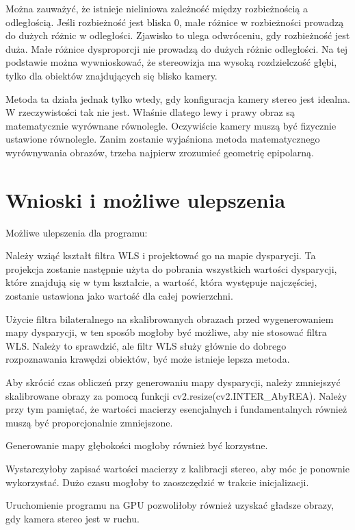 \documentclass[magisterska]{pracadypl}
\begin{document}
Można zauważyć, że istnieje nieliniowa zależność między rozbieżnością a odległością.
Jeśli rozbieżność jest bliska 0, małe różnice w rozbieżności prowadzą do dużych różnic w odległości.
Zjawisko to ulega odwróceniu, gdy rozbieżność jest duża. Małe różnice dysproporcji nie prowadzą do dużych różnic odległości. Na tej podstawie można wywnioskować, że stereowizja ma wysoką rozdzielczość głębi, tylko dla obiektów znajdujących się blisko kamery.

Metoda ta działa jednak tylko wtedy, gdy konfiguracja kamery stereo jest idealna. W
rzeczywistości tak nie jest. Właśnie dlatego lewy i prawy obraz są
matematycznie wyrównane równolegle. Oczywiście kamery muszą być fizycznie ustawione równolegle.
Zanim zostanie wyjaśniona metoda matematycznego wyrównywania obrazów, trzeba najpierw zrozumieć geometrię epipolarną.

\section{Wnioski i możliwe ulepszenia}

Możliwe ulepszenia dla programu:

Należy wziąć kształt filtra WLS i projektować go na mapie dysparycji. Ta projekcja zostanie następnie użyta do pobrania wszystkich wartości dysparycji, które znajdują się w tym kształcie, a wartość, która występuje najczęściej, zostanie ustawiona jako wartość dla całej powierzchni.

Użycie filtra bilateralnego na skalibrowanych obrazach przed wygenerowaniem mapy dysparycji, w ten sposób mogłoby być możliwe, aby nie stosować filtra WLS. Należy to sprawdzić, ale filtr WLS służy głównie do dobrego rozpoznawania krawędzi obiektów, być może istnieje lepsza metoda.

Aby skrócić czas obliczeń przy generowaniu mapy dysparycji, należy zmniejszyć skalibrowane obrazy za pomocą funkcji cv2.resize(cv2.INTER\_AbyREA). Należy przy tym pamiętać, że wartości macierzy esencjalnych i fundamentalnych również muszą być proporcjonalnie zmniejszone.

Generowanie mapy głębokości mogłoby również być korzystne.

Wystarczyłoby zapisać wartości macierzy z kalibracji stereo, aby móc je ponownie wykorzystać. Dużo czasu mogłoby to zaoszczędzić w trakcie inicjalizacji.

Uruchomienie programu na GPU pozwoliłoby również uzyskać gładsze obrazy, gdy kamera stereo jest w ruchu.
\end{document}
